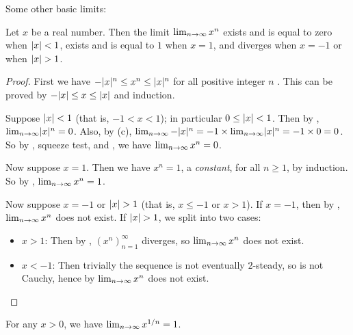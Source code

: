 Some other basic limits:
\begin{lemma} \label{lem 6.5.2}
Let \(x\) be a real number.
Then the limit \(\lim_{n \to \infty} x^n\) exists and is equal to zero when \(\lvert x\rvert < 1\),
exists and is equal to \(1\) when \(x = 1\),
and diverges when \(x = -1\) or when \(\lvert x\rvert > 1\).
\end{lemma}

\begin{proof}
First we have \(-\lvert x\rvert^n \le x^n \le \lvert x\rvert^n\) for all positive integer \(n\) .
This can be proved by \(-\lvert x\rvert \le x \le \lvert x\rvert\) and induction.

Suppose \(\lvert x\rvert < 1\) (that is, \(-1 < x < 1\)); in particular \(0 \le \lvert x\rvert < 1\).
Then by , \(\lim_{n \to \infty} \lvert x\rvert^n = 0\).
Also, by (c), \(\lim_{n \to \infty} -\lvert x\rvert^n = -1 \times \lim_{n \to \infty} \lvert x\rvert^n = -1 \times 0 = 0\).
So by , squeeze test, and , we have \(\lim_{n \to \infty} x^n = 0\).

Now suppose \(x = 1\).
Then we have \(x^n = 1\), a \emph{constant}, for all \(n \ge 1\), by induction.
So by , \(\lim_{n \to \infty} x^n = 1\).

Now suppose \(x = -1\) or \(\lvert x\rvert > 1\) (that is, \(x \le -1\) or \(x > 1\)).
If \(x = -1\), then by , \(\lim_{n \to \infty} x^n\) does not exist.
If \(\lvert x\rvert > 1\), we split into two cases:
\begin{itemize}
    \item \(x > 1\): Then by , \((x^n)_{n = 1}^{\infty}\) diverges, so \(\lim_{n \to \infty} x^n\) does not exist.
    \item \(x < -1\): Then trivially the sequence is not eventually \(2\)-steady, so is not Cauchy, hence by  \(\lim_{n \to \infty} x^n\) does not exist.
\end{itemize}
\end{proof}

\begin{lemma} \label{lem 6.5.3}
For any \(x > 0\), we have \(\lim_{n \to \infty} x^{1/n} = 1\).
\end{lemma}

